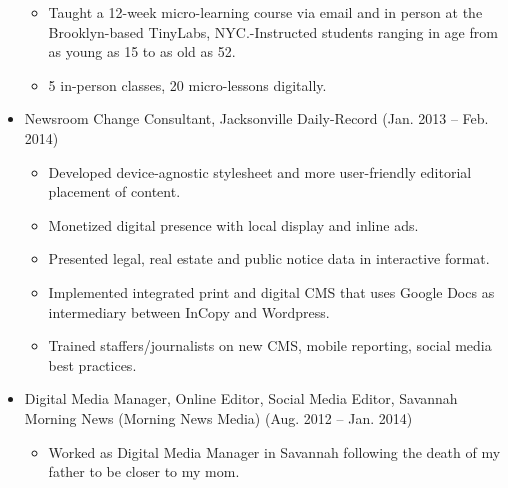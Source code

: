 \documentclass{article}
\begin{document}
\begin{itemize}[noitemsep,topsep=\mdcompacttopsep]
\begin{itemize}[noitemsep,topsep=\mdcompacttopsep]%

\item{}Taught a 12-week micro-learning course via email and in person at the Brooklyn-based TinyLabs, NYC.-Instructed students ranging in age from as young as 15 to as old as 52.%

\item{}5 in-person classes, 20 micro-lessons digitally.%
\end{itemize}%

\item{}Newsroom Change Consultant, Jacksonville Daily-Record (Jan. 2013 – Feb. 2014)

\begin{itemize}[noitemsep,topsep=\mdcompacttopsep]%

\item{}Developed device-agnostic stylesheet and more user-friendly editorial placement of content.%

\item{}Monetized digital presence with local display and inline ads.%

\item{}Presented legal, real estate and public notice data in interactive format.%

\item{}Implemented integrated print and digital CMS that uses Google Docs as intermediary between InCopy and Wordpress.%

\item{}Trained staffers/journalists on new CMS, mobile reporting, social media best practices.%
\end{itemize}%

\item{}Digital Media Manager, Online Editor, Social Media Editor, Savannah Morning News (Morning News Media) (Aug. 2012 – Jan. 2014)

\begin{itemize}[noitemsep,topsep=\mdcompacttopsep]%

\item{}Worked as Digital Media Manager in Savannah following the death of my father to be closer to my mom.%


\end{itemize}
\end{itemize}
\end{document}
